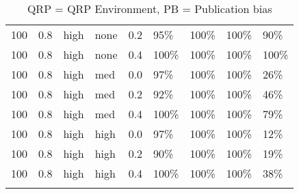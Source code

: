 \begin{longtable}{rrllrllll}
  100 & 0.8 & high & none & 0.2 & 95\% & 100\% & 100\% & 90\% \\ 
  100 & 0.8 & high & none & 0.4 & 100\% & 100\% & 100\% & 100\% \\ 
  100 & 0.8 & high & med & 0.0 & 97\% & 100\% & 100\% & 26\% \\ 
  100 & 0.8 & high & med & 0.2 & 92\% & 100\% & 100\% & 46\% \\ 
  100 & 0.8 & high & med & 0.4 & 100\% & 100\% & 100\% & 79\% \\ 
  100 & 0.8 & high & high & 0.0 & 97\% & 100\% & 100\% & 12\% \\ 
  100 & 0.8 & high & high & 0.2 & 90\% & 100\% & 100\% & 19\% \\ 
  100 & 0.8 & high & high & 0.4 & 100\% & 100\% & 100\% & 38\% \\ 
   \hline
\hline
\caption{QRP = QRP Environment, PB = Publication bias} 
\label{tab:convRate}
\end{longtable}
